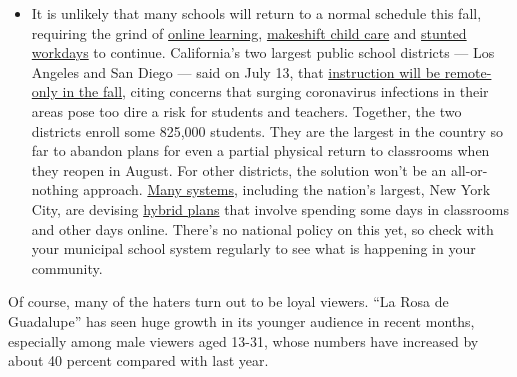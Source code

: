 \begin{itemize}
  \begin{itemize}
  \tightlist
  \item
    It is unlikely that many schools will return to a normal schedule
    this fall, requiring the grind of
    \href{https://www.nytimes3xbfgragh.onion/2020/06/05/us/coronavirus-education-lost-learning.html?action=click\&pgtype=Article\&state=default\&region=MAIN_CONTENT_3\&context=storylines_faq}{online
    learning},
    \href{https://www.nytimes3xbfgragh.onion/2020/05/29/us/coronavirus-child-care-centers.html?action=click\&pgtype=Article\&state=default\&region=MAIN_CONTENT_3\&context=storylines_faq}{makeshift
    child care} and
    \href{https://www.nytimes3xbfgragh.onion/2020/06/03/business/economy/coronavirus-working-women.html?action=click\&pgtype=Article\&state=default\&region=MAIN_CONTENT_3\&context=storylines_faq}{stunted
    workdays} to continue. California's two largest public school
    districts --- Los Angeles and San Diego --- said on July 13, that
    \href{https://www.nytimes3xbfgragh.onion/2020/07/13/us/lausd-san-diego-school-reopening.html?action=click\&pgtype=Article\&state=default\&region=MAIN_CONTENT_3\&context=storylines_faq}{instruction
    will be remote-only in the fall}, citing concerns that surging
    coronavirus infections in their areas pose too dire a risk for
    students and teachers. Together, the two districts enroll some
    825,000 students. They are the largest in the country so far to
    abandon plans for even a partial physical return to classrooms when
    they reopen in August. For other districts, the solution won't be an
    all-or-nothing approach.
    \href{https://bioethics.jhu.edu/research-and-outreach/projects/eschool-initiative/school-policy-tracker/}{Many
    systems}, including the nation's largest, New York City, are
    devising
    \href{https://www.nytimes3xbfgragh.onion/2020/06/26/us/coronavirus-schools-reopen-fall.html?action=click\&pgtype=Article\&state=default\&region=MAIN_CONTENT_3\&context=storylines_faq}{hybrid
    plans} that involve spending some days in classrooms and other days
    online. There's no national policy on this yet, so check with your
    municipal school system regularly to see what is happening in your
    community.
  \end{itemize}
\end{itemize}

Of course, many of the haters turn out to be loyal viewers. ``La Rosa de
Guadalupe'' has seen huge growth in its younger audience in recent
months, especially among male viewers aged 13-31, whose numbers have
increased by about 40 percent compared with last year.

